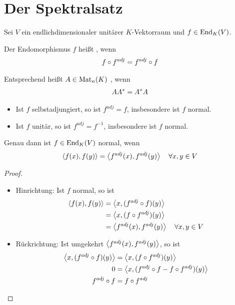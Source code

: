 \section{Der Spektralsatz}

Sei $V$ ein endlichdimensionaler unitärer $K$-Vektorraum und $f\in\operatorname{End}_K(V)$.

\begin{definition}
	Der Endomorphismus $f$ heißt , wenn
	\begin{align}
		f\circ f^{adj}=f^{adj}\circ f\notag
	\end{align}
	
	Entsprechend heißt $A\in\operatorname{Mat}_n(K)$ , wenn
	\begin{align}
		AA^*=A^*A\notag
	\end{align}
\end{definition}

\begin{example}
	\begin{itemize}
		\item Ist $f$ selbstadjungiert, so ist $f^{adj}=f$, insbesondere ist $f$ normal.
		\item Ist $f$ unitär, so ist $f^{adj}=f^{-1}$, insbesondere ist $f$ normal.
	\end{itemize}
\end{example}

\begin{lemma}
	Genau dann ist $f\in\operatorname{End}_K(V)$ normal, wenn
	\begin{align}
		\left\langle f(x),f(y)\right\rangle=\left\langle f^{adj}(x),f^{adj}(y)\right\rangle\quad\forall x,y\in V\notag
	\end{align}
\end{lemma}
\begin{proof}
	\begin{itemize}
		\item Hinrichtung: Ist $f$ normal, so ist
		\begin{align}
			\left\langle f(x),f(y)\right\rangle &= \left\langle x,(f^{adj}\circ f)(y)\right\rangle \notag \\
			&= \left\langle x,(f\circ f^{adj})(y)\right\rangle \notag \\
			&= \left\langle f^{adj}(x),f^{adj}(y)\right\rangle\quad\forall x,y\in V\notag
		\end{align}
		\item Rückrichtung: Ist umgekehrt $\left\langle f^{adj}(x),f^{adj}(y)\right\rangle$, so ist
		\begin{align}
			\left\langle x,(f^{adj}\circ f)(y)\right\rangle&=\left\langle x,(f\circ f^{adj})(y)\right\rangle \notag \\
			0 &= \left\langle x,(f^{adj}\circ f-f\circ f^{adj})(y)\right\rangle \notag \\
			f^{adj}\circ f&=f\circ f^{adj} \notag
		\end{align}
	\end{itemize}
\end{proof}

